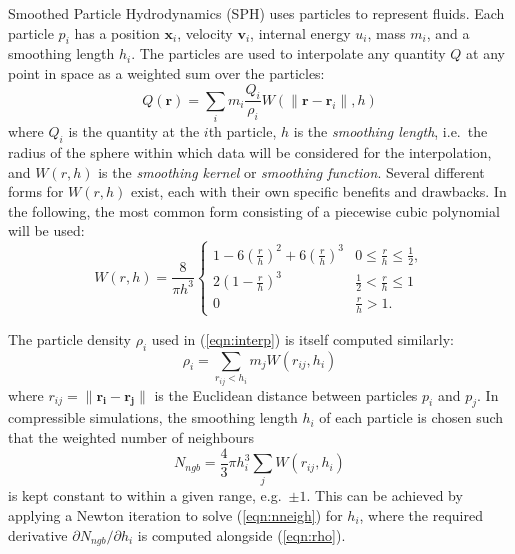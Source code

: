 \documentclass[final]{siamltex}
\newcommand{\eqn}[1]
    {(\ref{eqn:#1})}
\begin{document}
Smoothed Particle Hydrodynamics \cite{ref:Gingold1977,ref:Price2012}
 (SPH) uses particles to represent
fluids.
Each particle $p_i$ has a position $\mathbf x_i$,
velocity $\mathbf v_i$, internal energy $u_i$, mass $m_i$,
and a smoothing length $h_i$.
The particles are used to interpolate any quantity $Q$ at any 
point in space as a weighted sum over the particles:
%
\begin{equation}
    Q(\mathbf r) = \sum_i m_i \frac{Q_i}{\rho_i} W( \|\mathbf r - \mathbf r_i\| , h )
    \label{eqn:interp}
\end{equation}
%
where $Q_i$ is the quantity at the $i$th particle, $h$ is the
{\em smoothing length}, i.e.~the radius of the sphere within which data will
be considered for the interpolation, and
$W(r,h)$ is the {\em smoothing kernel} or {\em smoothing function}.
Several different forms for $W(r,h)$ exist, each with their own specific
benefits and drawbacks.
In the following, the most common form consisting of a piecewise
cubic polynomial will be used:
%
\begin{equation*}
    W(r,h) = \frac{8}{\pi h^3} \left\{
        \begin{array}{ll}
            1 - 6\left(\frac{r}{h}\right)^2 + 6\left(\frac{r}{h}\right)^3 & 0 \leq \frac{r}{h} \leq \frac{1}{2}, \\
            2\left( 1 - \frac{r}{h} \right)^3 & \frac{1}{2} < \frac{r}{h} \leq 1 \\
            0 & \frac{r}{h} > 1.
        \end{array}\right.
\end{equation*}

The particle density $\rho_i$ used in \eqn{interp} is itself
computed similarly:
%
\begin{equation}
    \rho_i = \sum_{r_{ij} < h_i} m_j W(r_{ij},h_i)
    \label{eqn:rho}
\end{equation}
%
where $r_{ij} = \|\mathbf{r_i}-\mathbf{r_j}\|$ is the Euclidean
distance between particles $p_i$ and $p_j$.
In compressible simulations, the smoothing length $h_i$ of each
particle is chosen such that the weighted number of neighbours
%
\begin{equation}
    N_{ngb} = \frac{4}{3}\pi h_i^3 \sum_j W( r_{ij} , h_i )
    \label{eqn:nneigh}
\end{equation}
%
is kept constant to within a given range, e.g.~$\pm 1$.
This can be achieved by applying a Newton iteration to solve
\eqn{nneigh} for $h_i$, where the required derivative
$\partial N_{ngb}/\partial h_i$ is computed alongside \eqn{rho}.
\end{document}
